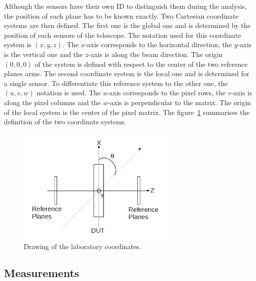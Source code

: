     Although the sensors have their own ID to distinguish them during the analysis, the position of each plane has to be known exactly.
    Two Cartesian coordinate systems are then defined.
    The first one is the global one and is determined by the position of each sensors of the telescope.
    The notation used for this coordinate system is $(x,y,z)$.
    The $x$-axis corresponds to the horizontal direction, the $y$-axis is the vertical one and the $z$-axis is along the beam direction.
    The origin $(0,0,0)$ of the system is defined with respect to the center of the two reference planes arms.
    The second coordinate system is the local one and is determined for a single sensor.
    To differentiate this reference system to the other one, the $(u,v,w)$  notation is used.
    The $u$-axis corresponds to the pixel rows, the $v$-axis is along the pixel columns and the $w$-axis is perpendicular to the matrix.
    The origin of the local system is the center of the pixel matrix.
    The figure~\ref{fig:labCoordinates} summarises the definition of the two coordinate systems.

    \begin{figure}
      \centering
      \includegraphics[width = 0.7\textwidth]{Pictures/deformation/lab_frame.png}
      \caption{Drawing of the laboratory coordinates.}
      \label{fig:labCoordinates}
    \end{figure}

    \subsection{Measurements}

